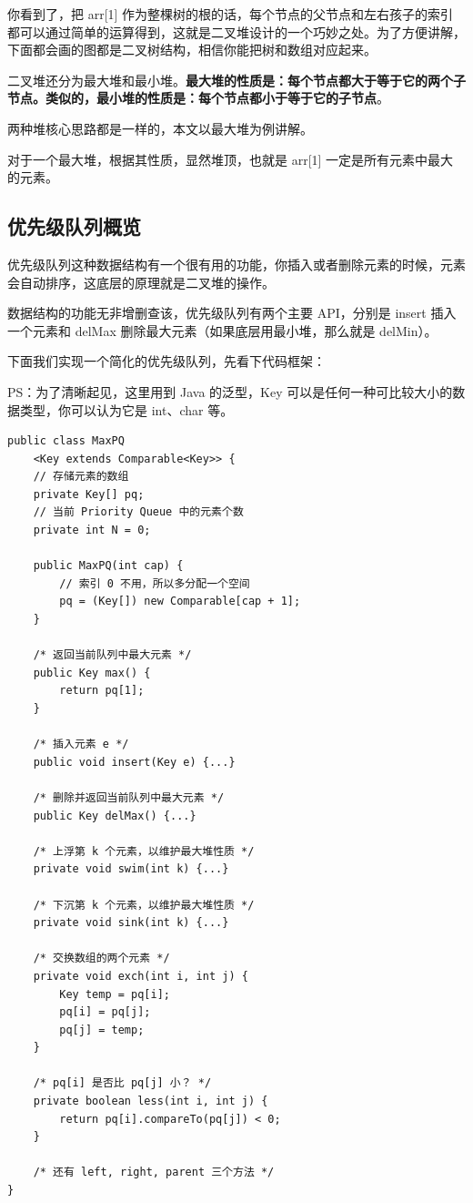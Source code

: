\documentclass[12pt]{article}
\begin{document}
你看到了，把 arr[1] 作为整棵树的根的话，每个节点的父节点和左右孩子的索引都可以通过简单的运算得到，这就是二叉堆设计的一个巧妙之处。为了方便讲解，下面都会画的图都是二叉树结构，相信你能把树和数组对应起来。

二叉堆还分为最大堆和最小堆。\textbf{最大堆的性质是：每个节点都大于等于它的两个子节点。类似的，最小堆的性质是：每个节点都小于等于它的子节点}。

两种堆核心思路都是一样的，本文以最大堆为例讲解。

对于一个最大堆，根据其性质，显然堆顶，也就是 arr[1] 一定是所有元素中最大的元素。

\subsection{优先级队列概览}
优先级队列这种数据结构有一个很有用的功能，你插入或者删除元素的时候，元素会自动排序，这底层的原理就是二叉堆的操作。

数据结构的功能无非增删查该，优先级队列有两个主要 API，分别是 insert 插入一个元素和 delMax 删除最大元素（如果底层用最小堆，那么就是 delMin）。

下面我们实现一个简化的优先级队列，先看下代码框架：

PS：为了清晰起见，这里用到 Java 的泛型，Key 可以是任何一种可比较大小的数据类型，你可以认为它是 int、char 等。
\begin{lstlisting}
public class MaxPQ
    <Key extends Comparable<Key>> {
    // 存储元素的数组
    private Key[] pq;
    // 当前 Priority Queue 中的元素个数
    private int N = 0;

    public MaxPQ(int cap) {
        // 索引 0 不用，所以多分配一个空间
        pq = (Key[]) new Comparable[cap + 1];
    }

    /* 返回当前队列中最大元素 */
    public Key max() {
        return pq[1];
    }

    /* 插入元素 e */
    public void insert(Key e) {...}

    /* 删除并返回当前队列中最大元素 */
    public Key delMax() {...}

    /* 上浮第 k 个元素，以维护最大堆性质 */
    private void swim(int k) {...}

    /* 下沉第 k 个元素，以维护最大堆性质 */
    private void sink(int k) {...}

    /* 交换数组的两个元素 */
    private void exch(int i, int j) {
        Key temp = pq[i];
        pq[i] = pq[j];
        pq[j] = temp;
    }

    /* pq[i] 是否比 pq[j] 小？ */
    private boolean less(int i, int j) {
        return pq[i].compareTo(pq[j]) < 0;
    }

    /* 还有 left, right, parent 三个方法 */
}
\end{lstlisting}
\end{document}
